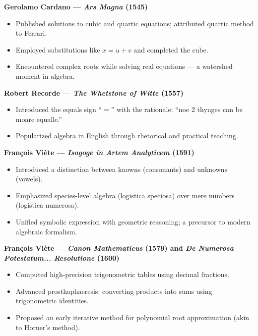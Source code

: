 \documentclass[9pt]{article}
\begin{document}
\textbf{Gerolamo Cardano — \textit{Ars Magna} (1545)}

\begin{itemize}
    \item Published solutions to cubic and quartic equations; attributed quartic method to Ferrari.
    \item Employed substitutions like $x = u + v$ and completed the cube.
    \item Encountered complex roots while solving real equations — a watershed moment in algebra.
\end{itemize}

\textbf{Robert Recorde — \textit{The Whetstone of Witte} (1557)}

\begin{itemize}
    \item Introduced the equals sign ``$=$'' with the rationale: ``noe 2 thynges can be moare equalle.''
    \item Popularized algebra in English through rhetorical and practical teaching.
\end{itemize}

\textbf{Fran\c{c}ois Vi\`ete — \textit{Isagoge in Artem Analyticem} (1591)}

\begin{itemize}
    \item Introduced a distinction between knowns (consonants) and unknowns (vowels).
    \item Emphasized species-level algebra (logistica speciosa) over mere numbers (logistica numerosa).
    \item Unified symbolic expression with geometric reasoning; a precursor to modern algebraic formalism.
\end{itemize}

\textbf{Fran\c{c}ois Vi\`ete — \textit{Canon Mathematicus} (1579) and \textit{De Numerosa Potestatum... Resolutione} (1600)}

\begin{itemize}
    \item Computed high-precision trigonometric tables using decimal fractions.
    \item Advanced prosthaphaeresis: converting products into sums using trigonometric identities.
    \item Proposed an early iterative method for polynomial root approximation (akin to Horner’s method).
\end{itemize}
\end{document}
